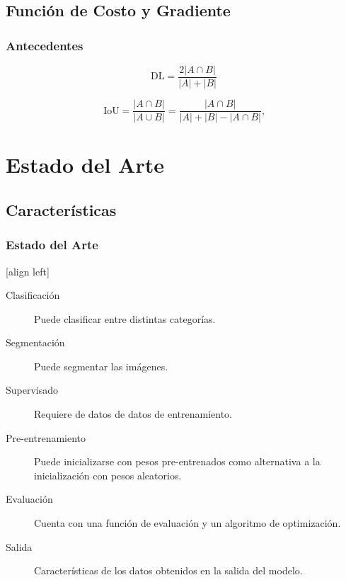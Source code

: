 \documentclass{beamer}
\begin{document}
\subsection{Función de Costo y Gradiente}
\begin{frame}
    \frametitle{Antecedentes}
    \begin{equation}\label{eq:dice_loss}
        \text{DL} = \frac{2|A \cap B |}{|A| + |B|}
    \end{equation}        
    
    \begin{equation}\label{eq:jacc}
        \text{IoU} = \frac{|A \cap B|}{| A \cup B |} = \frac{|A \cap B|}{|A| + |B| - |A \cap B|} \text{,}
      \end{equation}
      
    
\end{frame}

\section{Estado del Arte}

\subsection{Características}
\begin{frame}
    \frametitle{Estado del Arte}
    [align left]
    \begin{description}
        \item[Clasificación]{Puede clasificar entre distintas categorías.}
        \item[Segmentación]{Puede segmentar las imágenes.}
        \item[Supervisado]{Requiere de datos de datos de entrenamiento.}
        \item[Pre-entrenamiento]{Puede inicializarse con pesos pre-entrenados como alternativa a la inicialización con pesos aleatorios.}
        \item[Evaluación]{Cuenta con una función de evaluación y un algoritmo de optimización.}
        \item[Salida]{Características de los datos obtenidos en la salida del modelo.}
    \end{description}
\end{frame}
\end{document}
